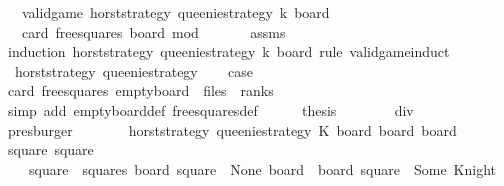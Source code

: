 \begin{isabellebody}
\ \ \ {\isachardoublequoteopen}valid{\isacharunderscore}game\ horst{\isacharunderscore}strategy\ queenie{\isacharunderscore}strategy\ k\ board{\isachardoublequoteclose}\isanewline
\ \ \ {\isachardoublequoteopen}card\ {\isacharparenleft}free{\isacharunderscore}squares\ board{\isacharparenright}\ mod\ {}\ {\isacharequal}\ {}{\isachardoublequoteclose}\isanewline
%
\isadelimproof
\ \ %
\endisadelimproof
%
\isatagproof
{}\isamarkupfalse%
\ assms\isanewline
{}\isamarkupfalse%
\ {\isacharparenleft}induction\ horst{\isacharunderscore}strategy\ queenie{\isacharunderscore}strategy\ k\ board\ rule{\isacharcolon}\ valid{\isacharunderscore}game{\isachardot}induct{\isacharparenright}\isanewline
\ \ \isamarkupfalse%
\ {\isacharparenleft}{}\ horst{\isacharunderscore}strategy\ queenie{\isacharunderscore}strategy{\isacharparenright}\isanewline
\ \ \isamarkupfalse%
\ {\isacharquery}case\isanewline
\ \ \isamarkupfalse%
{\isacharminus}\isanewline
\ \ \ \ \isamarkupfalse%
\ {\isachardoublequoteopen}card\ {\isacharparenleft}free{\isacharunderscore}squares\ empty{\isacharunderscore}board{\isacharparenright}\ {\isacharequal}\ files\ {\isacharasterisk}\ ranks{\isachardoublequoteclose}\isanewline
\ \ \ \ \ \ \isamarkupfalse%
\ {\isacharparenleft}simp\ add{\isacharcolon}\ empty{\isacharunderscore}board{\isacharunderscore}def\ free{\isacharunderscore}squares{\isacharunderscore}def{\isacharparenright}\isanewline
\ \ \ \ \isamarkupfalse%
\ {\isacharquery}thesis\isanewline
\ \ \ \ \ \ \isamarkupfalse%
\ div{}\isanewline
\ \ \ \ \ \ \isamarkupfalse%
\ presburger\isanewline
\ \ \isamarkupfalse%
\isanewline
{}\isamarkupfalse%
\isanewline
\ \ \isamarkupfalse%
\ {\isacharparenleft}{}\ horst{\isacharunderscore}strategy\ queenie{\isacharunderscore}strategy\ K\ board\ board{\isacharprime}\ board{\isacharprime}{\isacharprime}{\isacharparenright}\isanewline
\ \ \isamarkupfalse%
\ \isamarkupfalse%
\ square\ square{\isacharprime}\ \isanewline
\ \ \ \ {\isachardoublequoteopen}square\ {\isasymin}\ squares{\isachardoublequoteclose}\ {\isachardoublequoteopen}board\ square\ {\isacharequal}\ None{\isachardoublequoteclose}\ {\isachardoublequoteopen}board{\isacharprime}\ {\isacharequal}\ board\ {\isacharparenleft}square\ {\isacharcolon}{\isacharequal}\ Some\ Knight{\isacharparenright}{\isachardoublequoteclose}\isanewline

\end{isabellebody}
